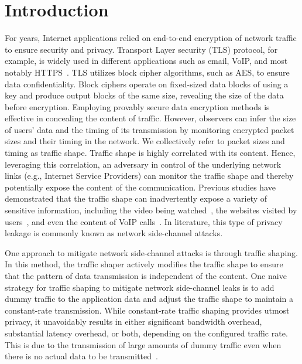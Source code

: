 
\chapter{Introduction}
\label{ch:introduction}

For years, Internet applications relied on end-to-end encryption of network traffic to ensure security and privacy.
Transport Layer security (TLS) protocol, for example, is widely used in different applications such as email, VoIP, and most notably HTTPS~\cite{rfc2818}.
TLS utilizes block cipher algorithms, such as AES, to ensure data confidentiality.
Block ciphers operate on fixed-sized data blocks of using a key and produce output blocks of the same size, revealing the size of the data before encryption. 
Employing provably secure data encryption methods is effective in concealing the content of traffic.
However, observers can infer the size of users' data and the timing of its transmission by monitoring encrypted packet sizes and their timing in the network.
We collectively refer to packet sizes and timing as traffic shape.
Traffic shape is highly correlated with its content.
Hence, leveraging this correlation, an adversary in control of the underlying network links (e.g., Internet Service Providers) can monitor the traffic shape and thereby potentially expose the content of the communication.
Previous studies have demonstrated that the traffic shape can inadvertently expose a variety of sensitive information, including the video being watched~\cite{schuster2017beautyburst}, the websites visited by users~\cite{wang2014supersequence, bhat2019varcnn}, and even the content of VoIP calls~\cite{white2011phonotactic}.
In literature, this type of privacy leakage is commonly known as network side-channel attacks.



One approach to mitigate network side-channel attacks is through traffic shaping. 
In this method, the traffic shaper actively modifies the traffic shape to ensure that the pattern of data transmission is independent of the content.  
One naive strategy for traffic shaping to mitigate network side-channel leaks is to add dummy traffic to the application data and adjust the traffic shape to maintain a constant-rate transmission.
While constant-rate traffic shaping provides utmost privacy, it unavoidably results in either significant bandwidth overhead, substantial latency overhead, or both, depending on the configured traffic rate.
This is due to the transmission of large amounts of dummy traffic even when there is no actual data to be transmitted~\cite{saponas2007devices}.

